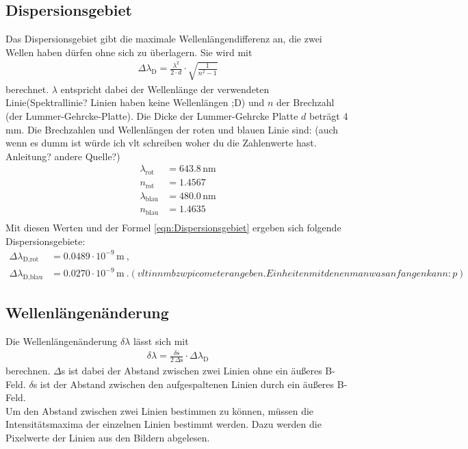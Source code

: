 \subsection{Dispersionsgebiet}
Das Dispersionsgebiet gibt die maximale Wellenlängendifferenz an, die zwei Wellen haben dürfen ohne sich zu überlagern. Sie wird mit
\begin{align}
  \Delta\lambda_\text{D} = \frac{\lambda^2}{2\cdot d} \cdot \sqrt{\frac{1}{n^2 - 1}}
  \label{eqn:Dispersionsgebiet}
\end{align}
berechnet. $\lambda$ entspricht dabei der Wellenlänge der verwendeten Linie(Spektrallinie? Linien haben keine Wellenlängen ;D) und $n$ der Brechzahl (der Lummer-Gehrcke-Platte). Die Dicke der Lummer-Gehrcke Platte $d$ beträgt 4\,mm. Die Brechzahlen und Wellenlängen der roten und blauen Linie sind: (auch wenn es dumm ist würde ich vlt schreiben woher du die Zahlenwerte hast. Anleitung? andere Quelle?)
\begin{align*}
  \lambda_\text{rot} &= 643.8\,\text{nm} \\
  n_\text{rot} &= 1.4567 \\
  \lambda_\text{blau} &= 480.0\,\text{nm} \\
  n_\text{blau} &= 1.4635 \\
\end{align*}
Mit diesen Werten und der Formel \eqref{eqn:Dispersionsgebiet} ergeben sich folgende Dispersionsgebiete:
\begin{align*}
  \Delta\lambda_\text{D,rot} &= 0.0489 \cdot 10^{-9}\,\text{m}\ , \\
  \Delta\lambda_\text{D,blau} &= 0.0270 \cdot 10^{-9}\,\text{m}\ . (vlt in nm bzw picometer angeben. Einheiten  mit denen man was anfangen kann :p)
\end{align*}

\subsection{Wellenlängenänderung}
Die Wellenlängenänderung $\delta\lambda$ lässt sich mit
\begin{align}
  \delta\lambda = \frac{\delta\text{s}}{2\,\Delta\text{s}}\cdot \Delta\lambda_\text{D}
  \label{eqn:Verschiebung}
\end{align}
berechnen. $\Delta$s ist dabei der Abstand zwischen zwei Linien ohne ein äußeres B-Feld. $\delta$s ist der Abstand zwischen den aufgespaltenen Linien durch ein äußeres B-Feld. \\
Um den Abstand zwischen zwei Linien bestimmen zu können, müssen die Intensitätsmaxima der einzelnen Linien bestimmt werden. Dazu werden die Pixelwerte der Linien aus den Bildern abgelesen.




